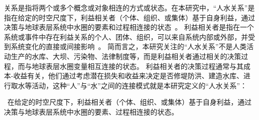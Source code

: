 关系是指将两个或多个概念或对象相连的方式或状态。在本研究中，“人水关系”是指在给定的时空尺度下，利益相关者（个体、组织、或集体）基于自身利益，通过决策与地球表层系统中水圈的要素和过程相连接的状态~\cite{bonnafous-boucher2016}。
利益相关者是指在一个系统或事件中存在利益关系的个人、团体、组织，可以来自系统内部或外部，并受到系统变化的直接或间接影响~\cite{bonnafous-boucher2016}。
简而言之，本研究关注的“人水关系”不是人类活动生产的水库、大坝、污染物、法律制度等，而是利益相关者通过相关的决策过程，而与地球表层水圈变量相互连接的状态。
利益相关者的决策过程通常与其成本-收益有关，他们通过考虑潜在损失和收益来决定是否修堤防洪、建造水库、进行取水等活动，这种“人”与“水”之间的连接模式就是本研究定义的“人水关系”：

{\kai~在给定的时空尺度下，利益相关者（个体、组织、或集体）基于自身利益，通过决策与地球表层系统中水圈的要素、过程相连接的状态。}
